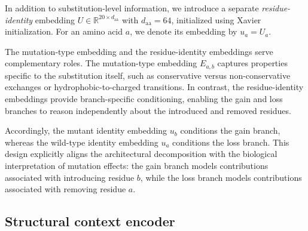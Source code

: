 \documentclass[11pt,a4paper]{article}
\theoremstyle{plain}
\theoremstyle{definition}
\begin{document}
In addition to substitution-level information, we introduce a separate
\emph{residue-identity} embedding
$U \in \mathbb{R}^{20 \times d_{\mathrm{aa}}}$ with
$d_{\mathrm{aa}} = 64$, initialized using Xavier initialization. For an
amino acid $a$, we denote its embedding by $u_a = U_a$.

The mutation-type embedding and the residue-identity embeddings serve complementary roles. The mutation-type embedding $E_{a,b}$ captures properties specific to the substitution itself, such as conservative versus non-conservative exchanges or hydrophobic-to-charged transitions. In contrast, the residue-identity embeddings provide branch-specific conditioning, enabling the gain and loss branches to reason independently about the introduced and removed residues.

Accordingly, the mutant identity embedding $u_b$ conditions the gain branch, whereas the wild-type identity embedding $u_a$ conditions the loss branch. This design explicitly aligns the architectural decomposition with the biological interpretation of mutation effects: the gain branch models contributions associated with introducing residue $b$, while the loss branch models contributions associated with removing residue $a$.

\subsection{Structural context encoder}
\label{sec:context}
\end{document}
